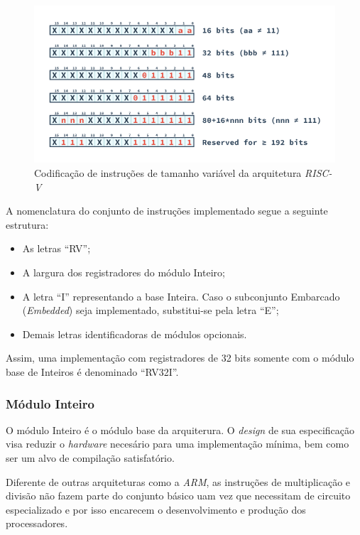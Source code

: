     \begin{figure}[H]
    \centering
        \includegraphics[width=1\linewidth]{../images/RV_InstructionLength.png}
        \caption{Codificação de instruções de tamanho variável da arquitetura
                    \textit{RISC-V}}\label{fig:riscv_var_length}
    \end{figure}

    { A nomenclatura do conjunto de instruções implementado segue a
        seguinte estrutura:
    }

    \begin{itemize}[leftmargin=20mm]
        \item {As letras ``RV'';}
        \item {A largura dos registradores do módulo Inteiro;}
        \item {A letra ``I'' representando a base Inteira. Caso o subconjunto
                Embarcado (\textit{Embedded}) seja implementado, substitui-se
                pela letra ``E'';}
        \item {Demais letras identificadoras de módulos opcionais.}
    \end{itemize}

    { Assim, uma implementação com registradores de 32 bits somente com o
        módulo base de Inteiros é denominado ``RV32I''.
    }

        \subsubsection{Módulo Inteiro}
        { O módulo Inteiro é o módulo base da arquiterura. O \textit{design} de sua
            especificação visa reduzir o \textit{hardware} necesário para uma
            implementação mínima, bem como ser um alvo de compilação satisfatório.
        }

        { Diferente de outras arquiteturas como a \textit{ARM}, as instruções de
            multiplicação e divisão não fazem parte do conjunto básico uam vez que
            necessitam de circuito especializado e por isso encarecem o desenvolvimento
            e produção dos processadores.
        }

